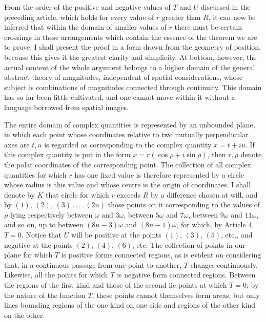From the order of the positive and negative values of $T$ and $U$ discussed in the preceding article, which holds for every value of $r$ greater than $R$, it can now be inferred that within the domain of smaller values of $r$ there must be certain crossings in these arrangements which contain the essence of the theorem we are to prove. I shall present the proof in a form drawn from the geometry of position, because this gives it the greatest clarity and simplicity. At bottom, however, the actual content of the whole argument belongs to a higher domain of the general abstract theory of magnitudes, independent of spatial considerations, whose subject is combinations of magnitudes connected through continuity. This domain has so far been little cultivated, and one cannot move within it without a language borrowed from spatial images.

The entire domain of complex quantities is represented by an unbounded plane, in which each point whose coordinates relative to two mutually perpendicular axes are $t,u$ is regarded as corresponding to the complex quantity $x=t+iu$. If this complex quantity is put in the form $x=r(\cos\rho+i\sin\rho)$, then $r,\rho$ denote the polar coordinates of the corresponding point. The collection of all complex quantities for which $r$ has one fixed value is therefore represented by a circle whose radius is this value and whose centre is the origin of coordinates. I shall denote by $K$ that circle for which $r$ exceeds $R$ by a difference chosen at will, and by $(1),\,(2),\,(3)\,.\,.\,.\,.\,(2n)$ those points on it corresponding to the values of $\rho$ lying respectively between $\omega$ and $3\omega$, between $5\omega$ and $7\omega$, between $9\omega$ and $11\omega$, and so on, up to between $(8n-3)\omega$ and $(8n-1)\omega$, for which, by Article 4, $T=0$. Notice that $U$ will be positive at the points $(1),\,(3),\,(5)$, etc., and negative at the points $(2),\,(4),\,(6)$, etc.
The collection of points in our plane for which $T$ is positive forms connected regions, as is evident on considering that, in a continuous passage from one point to another, $T$ changes continuously. Likewise, all the points for which $T$ is negative form connected regions. Between the regions of the first kind and those of the second lie points at which $T=0$; by the nature of the function $T$, these points cannot themselves form areas, but only lines bounding regions of the one kind on one side and regions of the other kind on the other.

